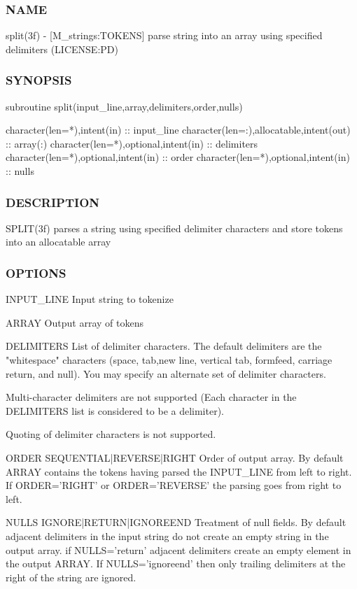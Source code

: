 \subsubsection*{N\+A\+ME}

split(3f) -\/ \mbox{[}M\+\_\+strings\+:T\+O\+K\+E\+NS\mbox{]} parse string into an array using specified delimiters (L\+I\+C\+E\+N\+SE\+:PD) 

\subsubsection*{S\+Y\+N\+O\+P\+S\+IS}

\begin{DoxyVerb}subroutine split(input_line,array,delimiters,order,nulls)

 character(len=*),intent(in)              :: input_line
 character(len=:),allocatable,intent(out) :: array(:)
 character(len=*),optional,intent(in)     :: delimiters
 character(len=*),optional,intent(in)     :: order
 character(len=*),optional,intent(in)     :: nulls
\end{DoxyVerb}
 \subsubsection*{D\+E\+S\+C\+R\+I\+P\+T\+I\+ON}

S\+P\+L\+I\+T(3f) parses a string using specified delimiter characters and store tokens into an allocatable array

\subsubsection*{O\+P\+T\+I\+O\+NS}

\begin{DoxyVerb}INPUT_LINE  Input string to tokenize

ARRAY       Output array of tokens

DELIMITERS  List of delimiter characters.
            The default delimiters are the "whitespace" characters
            (space, tab,new line, vertical tab, formfeed, carriage
            return, and null). You may specify an alternate set of
            delimiter characters.

            Multi-character delimiters are not supported (Each
            character in the DELIMITERS list is considered to be
            a delimiter).

            Quoting of delimiter characters is not supported.

ORDER SEQUENTIAL|REVERSE|RIGHT  Order of output array.
            By default ARRAY contains the tokens having parsed
            the INPUT_LINE from left to right. If ORDER='RIGHT'
            or ORDER='REVERSE' the parsing goes from right to left.

NULLS IGNORE|RETURN|IGNOREEND  Treatment of null fields.
            By default adjacent delimiters in the input string
            do not create an empty string in the output array. if
            NULLS='return' adjacent delimiters create an empty element
            in the output ARRAY. If NULLS='ignoreend' then only
            trailing delimiters at the right of the string are ignored.
\end{DoxyVerb}



